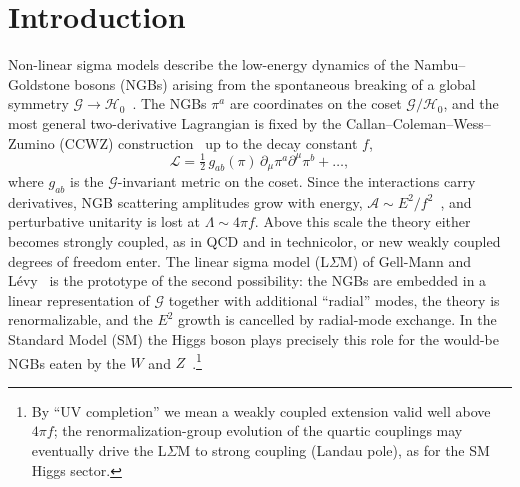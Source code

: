 \documentclass[aps,prd,twocolumn,superscriptaddress,nofootinbib,floatfix]{revtex4-2}
\theoremstyle{remark}
\newcommand{\G}{\mathcal{G}}
\newcommand{\Hg}{\mathcal{H}_0}    %
\begin{document}
\section{Introduction}
\label{sec:intro}

Non-linear sigma models describe the low-energy dynamics of the Nambu--Goldstone bosons (NGBs) arising from the spontaneous breaking of a global symmetry $\G\to\Hg$~\cite{Nambu:1960xd,Goldstone:1961eq,Goldstone:1962es}. The NGBs $\pi^a$ are coordinates on the coset $\G/\Hg$, and the most general two-derivative Lagrangian is fixed by the Callan--Coleman--Wess--Zumino (CCWZ) construction~\cite{Coleman:1969sm,Callan:1969sn} up to the decay constant $f$,
\begin{equation}
\mathcal{L}=\tfrac12\, g_{ab}(\pi)\,\partial_\mu\pi^a\partial^\mu\pi^b+\dots ,
\label{eq:NLSMgeneric}
\end{equation}
where $g_{ab}$ is the $\G$-invariant metric on the coset. Since the interactions carry derivatives, NGB scattering amplitudes grow with energy, $\mathcal{A}\sim E^2/f^2$~\cite{Weinberg:1966kf}, and perturbative unitarity is lost at $\Lambda\sim 4\pi f$. Above this scale the theory either becomes strongly coupled, as in QCD and in technicolor, or new weakly coupled degrees of freedom enter. The linear sigma model (L$\Sigma$M) of Gell-Mann and L\'evy~\cite{GellMann:1960np} is the prototype of the second possibility: the NGBs are embedded in a linear representation of $\G$ together with additional ``radial'' modes, the theory is renormalizable, and the $E^2$ growth is cancelled by radial-mode exchange. In the Standard Model (SM) the Higgs boson plays precisely this role for the would-be NGBs eaten by the $W$ and $Z$~\cite{Lee:1977eg,Dicus:1973gbw}.\footnote{By ``UV completion'' we mean a weakly coupled extension valid well above $4\pi f$; the renormalization-group evolution of the quartic couplings may eventually drive the L$\Sigma$M to strong coupling (Landau pole), as for the SM Higgs sector.}
\end{document}
